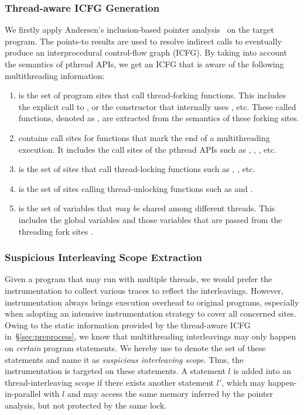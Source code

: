 \subsubsection{Thread-aware ICFG Generation}\label{sec:tcg}
We firstly apply Andersen's inclusion-based pointer analysis~\cite{Andersen94programanalysis} on the target program. The points-to results are used to resolve indirect calls to eventually produce an interprocedural control-flow graph (ICFG). By taking into account the semantics of pthread APIs, we get an ICFG that is aware of the following multithreading information:
\begin{enumerate}[(1)]
    \item \TStart is the set of program sites that call thread-forking functions. This includes the explicit call to , or the  constructor that internally uses , etc. These called functions, denoted as \FSStart, are extracted from the semantics of these forking sites.
\item \TEnd contains call sites for functions that mark the end of a multithreading execution. It includes the call sites of the pthread APIs such as , , , etc.
    \item \TLock is the set of sites that call thread-locking functions such as , , etc.
\item \TUnLock is the set of sites calling thread-unlocking functions such as  and .
    \item \TSharedVar is the set of variables that \emph{may be} shared among different threads. This includes the global variables and those variables that are passed from the threading fork sites \TStart.
\end{enumerate}

\subsubsection{Suspicious Interleaving Scope Extraction}\label{sec:extract}
Given a program that may run with multiple threads, we would prefer the instrumentation to collect various traces to reflect the interleavings. However, instrumentation always brings execution overhead to original programs, especially when adopting an intensive instrumentation strategy to cover all concerned sites.  Owing to the static information provided by the thread-aware ICFG in~\S\ref{sec:preprocess}, we know that multithreading interleavings may only happen on \emph{certain} program statements. We hereby use \mtiscope to denote the set of these statements and name it as \emph{suspicious interleaving scope}. Thus, the instrumentation is targeted on these statements. A statement $l$ is added into an thread-interleaving scope if there exists another statement $l'$, which may happen-in-parallel with $l$ and may access the same memory inferred by the pointer analysis, but not protected by the same lock.




